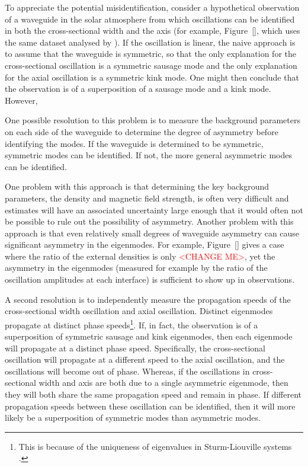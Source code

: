\documentclass[12pt]{../style-files/ociamthesis}
\begin{document}
To appreciate the potential misidentification, consider a hypothetical observation of a waveguide in the solar atmosphere from which oscillations can be identified in both the cross-sectional width and the axis (for example, Figure~\ref{}, which uses the same dataset analysed by \cite{mor12}). If the oscillation is linear, the naive approach is to assume that the waveguide is symmetric, so that the only explanation for the cross-sectional oscillation is a symmetric sausage mode and the only explanation for the axial oscillation is a symmetric kink mode. One might then conclude that the observation is of a superposition of a sausage mode and a kink mode. However, 

One possible resolution to this problem is to measure the background parameters on each side of the waveguide to determine the degree of asymmetry before identifying the modes. If the waveguide is determined to be symmetric, symmetric modes can be identified. If not, the more general asymmetric modes can be identified.

One problem with this approach is that determining the key background parameters, the density and magnetic field strength, is often very difficult and estimates will have an associated uncertainty large enough that it would often not be possible to rule out the possibility of asymmetry. Another problem with this approach is that even relatively small degrees of waveguide asymmetry can cause significant asymmetry in the eigenmodes. For example, Figure~\ref{} gives a case where the ratio of the external densities is only \textcolor{red}{<CHANGE ME>}, yet the asymmetry in the eigenmodes (measured for example by the ratio of the oscillation amplitudes at each interface) is sufficient to show up in observations.

A second resolution is to independently measure the propagation speeds of the cross-sectional width oscillation and axial oscillation. Distinct eigenmodes propagate at distinct phase speeds\footnote{This is because of the uniqueness of eigenvalues in Sturm-Liouville systems \citep{boy_etal12}.}. If, in fact, the observation is of a superposition of symmetric sausage and kink eigenmodes, then each eigenmode will propagate at a distinct phase speed. Specifically, the cross-sectional oscillation will propagate at a different speed to the axial oscillation, and the oscillations will become out of phase. Whereas, if the oscillations in cross-sectional width and axis are both due to a single asymmetric eigenmode, then they will both share the same propagation speed and remain in phase. If different propagation speeds between these oscillation can be identified, then it will more likely be a superposition of symmetric modes than asymmetric modes.
\end{document}

